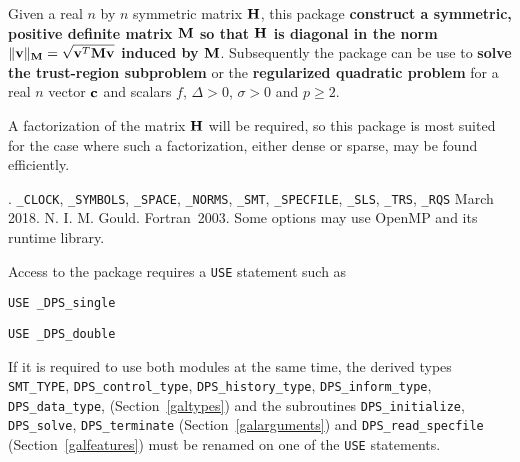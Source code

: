 \documentclass{galahad}
\newcommand{\packagename}{DPS}
\newcommand{\fullpackagename}{\libraryname\_\packagename}
\begin{document}
\galheader


\galsummary
Given a real $n$ by $n$ symmetric matrix ${\mathbf{H}}$, this package {\bf construct a
symmetric, positive definite matrix ${\mathbf{M}}$ so that ${\mathbf{H}}$
is diagonal in the norm $\|{\mathbf{v}}\|_{{\mathbf{M}}} = \sqrt{{\mathbf{v}}^T {\mathbf{M}} {\mathbf{v}}}$
induced by ${\mathbf{M}}$}. Subsequently the package can be use to
{\bf solve the trust-region subproblem}
or the {\bf regularized quadratic problem}
for a real $n$ vector ${\mathbf{c}}$ and scalars $f$, $\Delta>0$, $\sigma>0$
and $p \geq 2$.

\noindent
A factorization of the matrix ${\mathbf{H}}$ will be required, so this package is
most suited for the case where such a factorization, either dense or sparse,
may be found efficiently.


\galattributes
\galversions{\tt  \fullpackagename\_single, \fullpackagename\_double}.
\galuses
{\tt \libraryname\_CLOCK},
{\tt \libraryname\_SY\-M\-BOLS},
{\tt \libraryname\_SPACE}, {\tt \libraryname\_\-NORMS},
{\tt \libraryname\_\-SMT},
{\tt \libraryname\_\-SPECFILE},
{\tt \libraryname\_SLS}, {\tt \libraryname\_TRS},
{\tt \libraryname\_RQS}
\galdate March 2018.
\galorigin N. I. M. Gould.
\gallanguage Fortran~2003.
\galparallelism Some options may use OpenMP and its runtime library.


\galhowto

Access to the package requires a {\tt USE} statement such as

\medskip{}

\hskip0.5in {\tt USE \fullpackagename\_single}

\medskip{}

\hskip0.5in {\tt USE  \fullpackagename\_double}

\medskip

\noindent
If it is required to use both modules at the same time, the derived types
{\tt SMT\_TYPE},
{\tt \packagename\_control\_type},
{\tt \packagename\_history\_\-type},
{\tt \packagename\_inform\_type},
{\tt \packagename\_data\_type},
(Section~\ref{galtypes})
and the subroutines
{\tt \packagename\_initialize},
{\tt \packagename\_solve}, {\tt \packagename\_\-terminate}
(Section~\ref{galarguments})
and
{\tt \packagename\_read\_specfile}
(Section~\ref{galfeatures})
must be renamed on one of the {\tt USE} statements.
\end{document}

